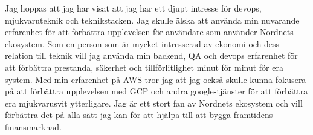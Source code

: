 \documentclass[../../main.tex]{subfiles}
\begin{document}
Jag hoppas att jag har visat att jag har ett djupt intresse för devops, mjukvaruteknik och teknikstacken. Jag skulle älska att använda min nuvarande erfarenhet för att förbättra upplevelsen för användare som använder Nordnets ekosystem. Som en person som är mycket intresserad av ekonomi och dess relation till teknik vill jag använda min backend, QA och devops erfarenhet för att förbättra prestanda, säkerhet och tillförlitlighet minut för minut för era system. Med min erfarenhet på AWS tror jag att jag också skulle kunna fokusera på att förbättra upplevelsen med GCP och andra google-tjänster för att förbättra era mjukvarusvit ytterligare. Jag är ett stort fan av Nordnets ekosystem och vill förbättra det på alla sätt jag kan för att hjälpa till att bygga framtidens finansmarknad.
\\
\end{document}
